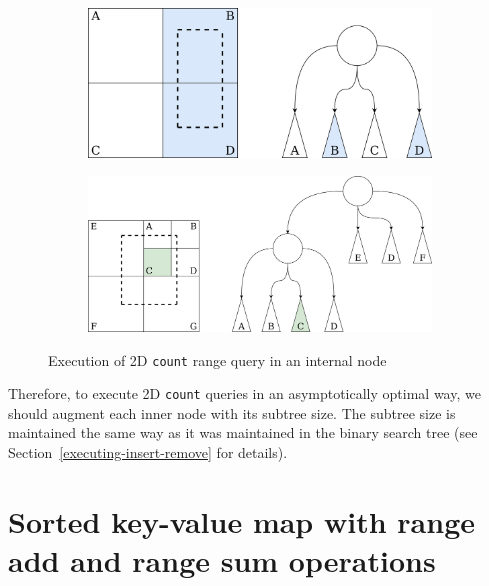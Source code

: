 \documentclass[times, dvipsnames,%
               languages={russian,english} %
              ]{itmo-student-thesis}
\begin{document}
\begin{figure}[H]
     \centering
     \begin{subfigure}[b]{0.45\linewidth}
          \centering
          \includegraphics[width=\linewidth]{pics/count-2d-choose.png}
          \label{count-2d-choose-pic}
     \end{subfigure}
     \hfill
     \begin{subfigure}[b]{0.45\linewidth}
          \centering
          \includegraphics[width=\linewidth]{pics/count-2d-trim.png}
          \label{count-2d-trim-pic}
     \end{subfigure}
    \caption{Execution of 2D \texttt{count} range query in an internal node}
    \label{count-2d-pics}
\end{figure}

Therefore, to execute 2D \texttt{count} queries in an asymptotically optimal way, we should augment each inner node with its subtree size. The subtree size is maintained the same way as it was maintained in the binary search tree (see Section~\ref{executing-insert-remove} for details).

\section{Sorted key-value map with range add and range sum operations}
\end{document}
